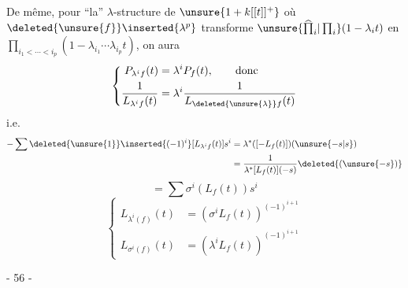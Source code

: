 De même, pour ``la'' $\lambda$-structure de $\unsure{1+k[[t]]^{+}}$ où $\deleted{\unsure{f}}\inserted{\lambda^p}$ transforme $\unsure{\widehat{\prod}_i|\prod_i}(1-\lambda_i t)$ en $\prod_{i_1<\cdots<i_p}(1-\lambda_{i_1}\cdots\lambda_{i_p}t)$, on aura
\[
\left\{\begin{aligned}
P_{\lambda^i f}(t)&=\lambda^iP_f(t),\qquad\text{donc}\\
\frac{1}{L_{\lambda^i f}(t)}&=\lambda^i\frac{1}{L_{\deleted{\unsure{\lambda}}f}(t)}
\end{aligned}\right.
\]
i.e.
\[
\begin{aligned}
-\sum\deleted{\unsure{1}}\inserted{(-1)^i}[L_{\lambda^i f}(t)]s^i
&=\lambda^*([-L_f(t)])(\unsure{-s|s})\\
&=\frac{1}{\lambda^*[L_f(t)](-s)}\deleted{(\unsure{-s})}
\end{aligned}
\]
\deleted{
\[
\left(\sum[\lambda^i(L_f(t))]s^i\right)\left(\sum[L_{\lambda^i f}(t)]s^i\right)=-1=\left[\frac{1}{1-t}\right]
\]
}
\[
=\sum\sigma^i(L_f(t))s^i
\]
\[
\left\{\begin{aligned}
L_{\lambda^i(f)}(t)&=\left(\sigma^i L_f(t)\right)^{(-1)^{i+1}}\\
L_{\sigma^i(f)}(t)&=\left(\lambda^i L_f(t)\right)^{(-1)^{i+1}}
\end{aligned}\right.
\]


\begin{center}- 56 -\end{center}

